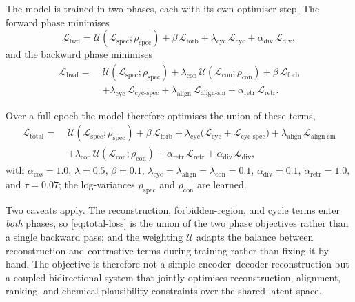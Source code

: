 The model is trained in two phases, each with its own optimiser step. The forward phase minimises
\begin{equation}
    \label{eq:loss-fwd}
    \mathcal{L}_{\mathrm{fwd}} = \mathcal{U}(\mathcal{L}_{\mathrm{spec}};\rho_{\mathrm{spec}}) + \beta\,\mathcal{L}_{\mathrm{forb}} + \lambda_{\mathrm{cyc}}\,\mathcal{L}_{\mathrm{cyc}} + \alpha_{\mathrm{div}}\,\mathcal{L}_{\mathrm{div}},
\end{equation}
and the backward phase minimises
\begin{equation}
    \label{eq:loss-bwd}
    \begin{aligned}
        \mathcal{L}_{\mathrm{bwd}} = \;& \mathcal{U}(\mathcal{L}_{\mathrm{spec}};\rho_{\mathrm{spec}}) + \lambda_{\mathrm{con}}\,\mathcal{U}(\mathcal{L}_{\mathrm{con}};\rho_{\mathrm{con}}) + \beta\,\mathcal{L}_{\mathrm{forb}} \\
        & + \lambda_{\mathrm{cyc}}\,\mathcal{L}_{\text{cyc-spec}} + \lambda_{\text{align}}\,\mathcal{L}_{\text{align-sm}} + \alpha_{\mathrm{retr}}\,\mathcal{L}_{\mathrm{retr}}.
    \end{aligned}
\end{equation}

Over a full epoch the model therefore optimises the union of these terms,
\begin{equation}
    \label{eq:total-loss}
    \begin{aligned}
        \mathcal{L}_{\mathrm{total}} = \;& \mathcal{U}(\mathcal{L}_{\mathrm{spec}};\rho_{\mathrm{spec}}) + \beta\,\mathcal{L}_{\mathrm{forb}} + \lambda_{\mathrm{cyc}}\bigl(\mathcal{L}_{\mathrm{cyc}} + \mathcal{L}_{\text{cyc-spec}}\bigr) + \lambda_{\text{align}}\,\mathcal{L}_{\text{align-sm}} \\
        & + \lambda_{\mathrm{con}}\,\mathcal{U}(\mathcal{L}_{\mathrm{con}};\rho_{\mathrm{con}}) + \alpha_{\mathrm{retr}}\,\mathcal{L}_{\mathrm{retr}} + \alpha_{\mathrm{div}}\,\mathcal{L}_{\mathrm{div}},
    \end{aligned}
\end{equation}
with $\alpha_{\cos}=1.0$, $\lambda=0.5$, $\beta=0.1$, $\lambda_{\mathrm{cyc}}=\lambda_{\text{align}}=\lambda_{\mathrm{con}}=0.1$, $\alpha_{\mathrm{div}}=0.1$, $\alpha_{\mathrm{retr}}=1.0$, and $\tau=0.07$; the log-variances $\rho_{\mathrm{spec}}$ and $\rho_{\mathrm{con}}$ are learned.

Two caveats apply. 
The reconstruction, forbidden-region, and cycle terms enter \emph{both} phases, so \cref{eq:total-loss} is the union of the two phase objectives rather than a single backward pass; and the weighting $\mathcal{U}$ adapts the balance between reconstruction and contrastive terms during training rather than fixing it by hand. 
The objective is therefore not a simple encoder--decoder reconstruction but a coupled bidirectional system that jointly optimises reconstruction, alignment, ranking, and chemical-plausibility constraints over the shared latent space.

